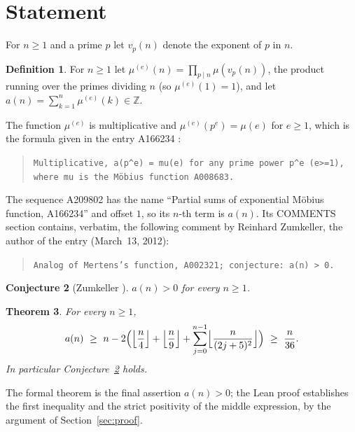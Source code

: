 \documentclass[11pt]{amsart}
\theoremstyle{plain}
\newtheorem{theorem}{Theorem}
\newtheorem{conjecture}[theorem]{Conjecture}
\theoremstyle{definition}
\newtheorem{definition}[theorem]{Definition}
\newcommand{\Z}{\mathbb{Z}}
\newcommand{\mue}{\mu^{(e)}}
\begin{document}
\section{Statement}\label{sec:statement}

For $n\ge1$ and a prime $p$ let $v_p(n)$ denote the exponent of $p$ in $n$.

\begin{definition}\label{def:main}
For $n\ge1$ let $\mue(n)=\prod_{p\mid n}\mu(v_p(n))$, the product running over the primes dividing $n$ (so $\mue(1)=1$), and let $a(n)=\sum_{k=1}^{n}\mue(k)\in\Z$.
\end{definition}

The function $\mue$ is multiplicative and $\mue(p^e)=\mu(e)$ for $e\ge1$, which is the formula given in the entry A166234 \cite{A166234}:
\begin{quote}\raggedright
\texttt{Multiplicative, a(p\^{}e) = mu(e) for any prime power p\^{}e (e>=1), where mu is the M\"obius function A008683.}
\end{quote}
The sequence A209802 \cite{A209802} has the name ``Partial sums of exponential M\"obius function, A166234'' and offset $1$, so its $n$-th term is $a(n)$. Its COMMENTS section contains, verbatim, the following comment by Reinhard Zumkeller, the author of the entry (March~13, 2012):
\begin{quote}\raggedright
\texttt{Analog of Mertens's function, A002321; conjecture: a(n) > 0.}
\end{quote}

\begin{conjecture}[Zumkeller \cite{A209802}]\label{conj}
$a(n)>0$ for every $n\ge1$.
\end{conjecture}

\begin{theorem}\label{thm:main}
For every $n\ge1$,
\[
  a(n)\ \ge\ n-2\Bigl(\Bigl\lfloor\frac n4\Bigr\rfloor+\Bigl\lfloor\frac n9\Bigr\rfloor+\sum_{j=0}^{n-1}\Bigl\lfloor\frac{n}{(2j+5)^2}\Bigr\rfloor\Bigr)\ \ge\ \frac{n}{36}.
\]
In particular Conjecture~\ref{conj} holds.
\end{theorem}

The formal theorem is the final assertion $a(n)>0$; the Lean proof establishes the first inequality and the strict positivity of the middle expression, by the argument of Section~\ref{sec:proof}.
\end{document}
